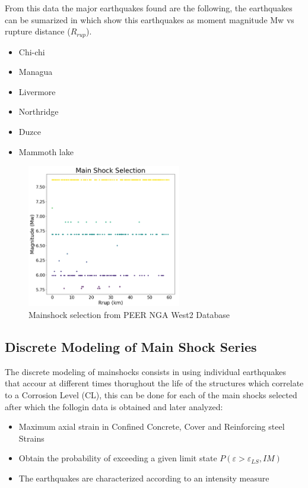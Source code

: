 From this data the major earthquakes found are the following, the earthquakes can be sumarized in  which show this earthquakes as moment magnitude {Mw} vs rupture distance ($R_{rup}$).

\begin{itemize}
	\item Chi-chi
	\item Managua
	\item Livermore
	\item Northridge
	\item Duzce 
	\item Mammoth lake
\end{itemize}

\begin{figure}[htbp]
	\centering
	\includegraphics[width=0.6\textwidth]{Chapter-4/figs/MainShock_Selection}
	\caption{Mainshock selection from PEER NGA West2 Database}
	\label{fig:MS_Selection}
\end{figure}

\subsection{Discrete Modeling of Main Shock Series}
The discrete modeling of mainshocks consists in using individual earthquakes that accour at different times thorughout the life of the structures which correlate to a Corrosion Level (CL), this can be done for each of the main shocks selected after which the follogin data is obtained and later analyzed:

\begin{itemize}
	\item Maximum axial strain in Confined Concrete, Cover and Reinforcing steel 
Strains
	\item Obtain the probability of exceeding a given limit state $P(\varepsilon >\varepsilon_{LS},IM)$
	\item The earthquakes are characterized according to an intensity measure

\end{itemize}


